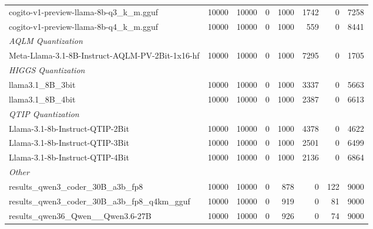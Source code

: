 \begin{table}[htbp]
{\begin{tabular}{lrrrrrrr}
    cogito-v1-preview-llama-8b-q3\_k\_m.gguf & 10000 & 10000 & 0 & 1000 & 1742 & 0 & 7258 \\
    cogito-v1-preview-llama-8b-q4\_k\_m.gguf & 10000 & 10000 & 0 & 1000 & 559 & 0 & 8441 \\
    \midrule
    \multicolumn{8}{l}{\textit{AQLM Quantization}} \\
    \midrule
    Meta-Llama-3.1-8B-Instruct-AQLM-PV-2Bit-1x16-hf & 10000 & 10000 & 0 & 1000 & 7295 & 0 & 1705 \\
    \midrule
    \multicolumn{8}{l}{\textit{HIGGS Quantization}} \\
    \midrule
    llama3.1\_8B\_3bit & 10000 & 10000 & 0 & 1000 & 3337 & 0 & 5663 \\
    llama3.1\_8B\_4bit & 10000 & 10000 & 0 & 1000 & 2387 & 0 & 6613 \\
    \midrule
    \multicolumn{8}{l}{\textit{QTIP Quantization}} \\
    \midrule
    Llama-3.1-8b-Instruct-QTIP-2Bit & 10000 & 10000 & 0 & 1000 & 4378 & 0 & 4622 \\
    Llama-3.1-8b-Instruct-QTIP-3Bit & 10000 & 10000 & 0 & 1000 & 2501 & 0 & 6499 \\
    Llama-3.1-8b-Instruct-QTIP-4Bit & 10000 & 10000 & 0 & 1000 & 2136 & 0 & 6864 \\
    \midrule
    \multicolumn{8}{l}{\textit{Other}} \\
    \midrule
    results\_qwen3\_coder\_30B\_a3b\_fp8 & 10000 & 10000 & 0 & 878 & 0 & 122 & 9000 \\
    results\_qwen3\_coder\_30B\_a3b\_fp8\_q4km\_gguf & 10000 & 10000 & 0 & 919 & 0 & 81 & 9000 \\
    results\_qwen36\_Qwen\_\_Qwen3.6-27B & 10000 & 10000 & 0 & 926 & 0 & 74 & 9000 \\
    \bottomrule
  \end{tabular}
  }
\end{table}

